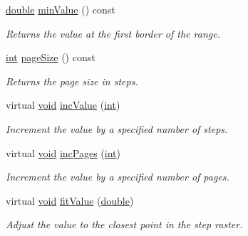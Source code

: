 \begin{DoxyCompactItemize}
\hyperlink{_super_l_u_support_8h_a8956b2b9f49bf918deed98379d159ca7}{double} \hyperlink{class_qwt_double_range_a8b8650a6f8a96144d3af21207ee71637}{min\-Value} () const 
\begin{DoxyCompactList}\small\item\em Returns the value at the first border of the range. \end{DoxyCompactList}\item 
\hyperlink{ioapi_8h_a787fa3cf048117ba7123753c1e74fcd6}{int} \hyperlink{class_qwt_double_range_ac12a5c43dc5839913379982ec40a39d8}{page\-Size} () const 
\begin{DoxyCompactList}\small\item\em Returns the page size in steps. \end{DoxyCompactList}\item 
virtual \hyperlink{group___u_a_v_objects_plugin_ga444cf2ff3f0ecbe028adce838d373f5c}{void} \hyperlink{class_qwt_double_range_a299c35c72e9b69f5a0e3dcd2b7da775b}{inc\-Value} (\hyperlink{ioapi_8h_a787fa3cf048117ba7123753c1e74fcd6}{int})
\begin{DoxyCompactList}\small\item\em Increment the value by a specified number of steps. \end{DoxyCompactList}\item 
virtual \hyperlink{group___u_a_v_objects_plugin_ga444cf2ff3f0ecbe028adce838d373f5c}{void} \hyperlink{class_qwt_double_range_a19b85337d4ab0b5f0579b02e4fb29a8f}{inc\-Pages} (\hyperlink{ioapi_8h_a787fa3cf048117ba7123753c1e74fcd6}{int})
\begin{DoxyCompactList}\small\item\em Increment the value by a specified number of pages. \end{DoxyCompactList}\item 
virtual \hyperlink{group___u_a_v_objects_plugin_ga444cf2ff3f0ecbe028adce838d373f5c}{void} \hyperlink{class_qwt_double_range_a63bc8ea5e7ecd776b7d32d21db1ea668}{fit\-Value} (\hyperlink{_super_l_u_support_8h_a8956b2b9f49bf918deed98379d159ca7}{double})
\begin{DoxyCompactList}\small\item\em Adjust the value to the closest point in the step raster. \end{DoxyCompactList}\end{DoxyCompactItemize}

